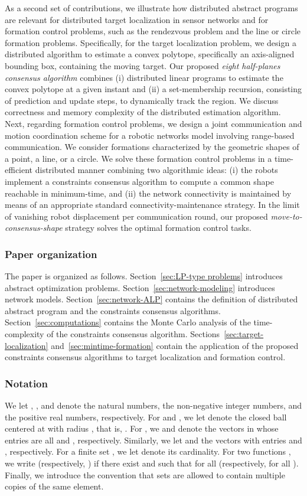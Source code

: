 \documentclass[onecolumn,journal,letterpaper]{IEEEtran}
\begin{document}
As a second set of contributions, we illustrate how distributed abstract
programs are relevant for distributed target localization in sensor
networks and for formation control problems, such as the rendezvous problem
and the line or circle formation problems. Specifically, for the target
localization problem, we design a distributed algorithm to estimate a
convex polytope, specifically an axis-aligned bounding box, containing the
moving target.  Our proposed \emph{eight half-planes consensus algorithm}
combines (i) distributed linear programs to estimate the convex polytope at
a given instant and (ii) a set-membership recursion, consisting of
prediction and update steps, to dynamically track the region. We discuss
correctness and memory complexity of the distributed estimation algorithm.
Next, regarding formation control problems, we design a joint communication
and motion coordination scheme for a robotic networks model involving
range-based communication.  We consider formations characterized by the
geometric shapes of a point, a line, or a circle.  We solve these formation
control problems in a time-efficient distributed manner combining two
algorithmic ideas: (i) the robots implement a constraints consensus
algorithm to compute a common shape reachable in minimum-time, and (ii) the
network connectivity is maintained by means of an appropriate standard
connectivity-maintenance strategy. In the limit of vanishing robot displacement per communication round, our
proposed \emph{move-to-consensus-shape} strategy solves the optimal
formation control tasks.


\subsubsection*{Paper organization}
The paper is organized as follows.  Section~\ref{sec:LP-type problems}
introduces abstract optimization problems.
Section~\ref{sec:network-modeling} introduces network models.
Section~\ref{sec:network-ALP} contains the definition of distributed
abstract program and the constraints consensus
algorithms. Section~\ref{sec:computations} contains the Monte Carlo
analysis of the time-complexity of the constraints consensus
algorithm. Sections~\ref{sec:target-localization}
and~\ref{sec:mintime-formation} contain the application of the proposed
constraints consensus algorithms to target localization and formation
control.


\subsubsection*{Notation}
We let , , and  denote the natural
numbers, the non-negative integer numbers, and the positive real numbers,
respectively. For  and , we let
 denote the closed ball centered at  with radius , that
is, .  For
, we  and  denote the vectors in 
whose entries are all  and , respectively. Similarly, we let
 and  the vectors with  entries  and
, respectively.  For a finite set , we let  denote
its cardinality.  For two functions , we write
 (respectively, ) if there exist
 and  such that  for all  (respectively,  for all ).  Finally, we
introduce the convention that sets are allowed to contain multiple copies
of the same element.
\end{document}
